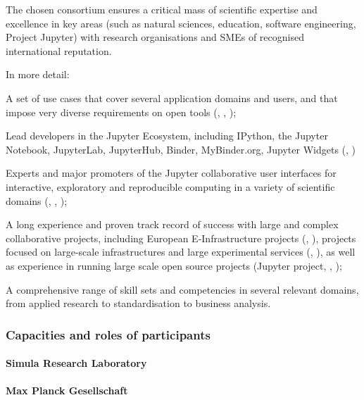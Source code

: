 The chosen consortium ensures a critical mass of scientific expertise and
excellence in key areas (such as natural sciences, education, software
engineering, Project Jupyter) with research organisations and SMEs of recognised
international reputation.

In more detail: 
\begin{compactitem}
\item A set of use cases that cover several application domains and users, and that impose very diverse
requirements on open tools (, , );
\item Lead developers in the Jupyter Ecosystem, including IPython, the Jupyter Notebook, JupyterLab,
JupyterHub, Binder, MyBinder.org, Jupyter Widgets (, )
\item Experts and major promoters of the Jupyter collaborative user interfaces
  for interactive, exploratory and reproducible computing in a variety of scientific domains (, , );
\item A long experience and proven track record of success with large and complex collaborative projects,
including European E-Infrastructure projects (, ),
projects focused on large-scale infrastructures and large experimental services (, ),
as well as experience in running large scale open source projects (Jupyter project, , );
\item A comprehensive range of skill sets and competencies in several relevant domains,
from applied research to standardisation to business analysis.
\end{compactitem}

\subsubsection{Capacities and roles of participants}

\paragraph{Simula Research Laboratory}


\paragraph{Max Planck Gesellschaft}

